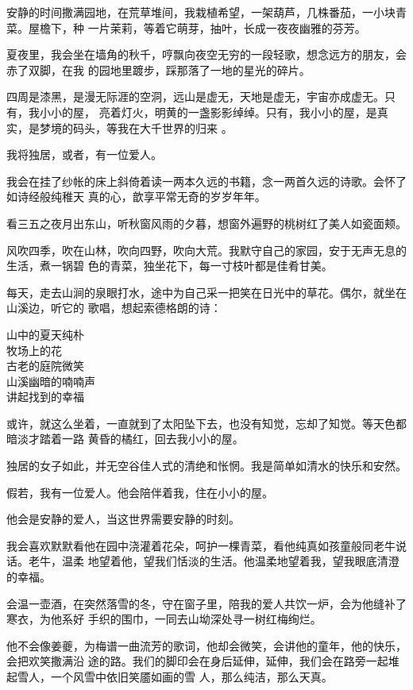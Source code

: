 \documentclass[12pt,a4paper]{article}
\begin{document}
		安静的时间撒满园地，在荒草堆间，我栽植希望，一架葫芦，几株番茄，一小块青菜。屋檐下，种
	一片茉莉，等着它萌芽，抽叶，长成一夜夜幽雅的芬芳。

		夏夜里，我会坐在墙角的秋千，哼飘向夜空无穷的一段轻歌，想念远方的朋友，会赤了双脚，在我
	的园地里踱步，踩那落了一地的星光的碎片。

		四周是漆黑，是漫无际涯的空洞，远山是虚无，天地是虚无，宇宙亦成虚无。只有，我小小的屋，
	亮着灯火，明黄的一盏影影绰绰。只有，我小小的屋，是真实，是梦境的码头，等我在大千世界的归来
	。

		我将独居，或者，有一位爱人。

		我会在挂了纱帐的床上斜倚着读一两本久远的书籍，念一两首久远的诗歌。会怀了如诗经般纯稚天
	真的心，歆享平常无奇的岁岁年年。

		看三五之夜月出东山，听秋窗风雨的夕暮，想窗外遍野的桃树红了美人如瓷面颊。

		风吹四季，吹在山林，吹向四野，吹向大荒。我默守自己的家园，安于无声无息的生活，煮一锅碧
	色的青菜，独坐花下，每一寸枝叶都是佳肴甘美。

		每天，走去山涧的泉眼打水，途中为自己采一把笑在日光中的草花。偶尔，就坐在山溪边，听它的
	歌唱，想起索德格朗的诗：

		\longpoem{}{}{}
		山中的夏天纯朴 \\
		牧场上的花 \\
		古老的庭院微笑 \\
		山溪幽暗的喃喃声 \\
		讲起找到的幸福
		\endlongpoem

		或许，就这么坐着，一直就到了太阳坠下去，也没有知觉，忘却了知觉。等天色都暗淡才踏着一路
	黄昏的橘红，回去我小小的屋。

		独居的女子如此，并无空谷佳人式的清绝和怅惘。我是简单如清水的快乐和安然。

		假若，我有一位爱人。他会陪伴着我，住在小小的屋。\par
		他会是安静的爱人，当这世界需要安静的时刻。

		我会喜欢默默看他在园中浇灌着花朵，呵护一棵青菜，看他纯真如孩童般同老牛说话。老牛，温柔
	地望着他，望我们恬淡的生活。他温柔地望着我，望我眼底清澄的幸福。

		会温一壶酒，在突然落雪的冬，守在窗子里，陪我的爱人共饮一炉，会为他缝补了寒衣，为他系好
	手织的围巾，一同去山坳深处寻一树红梅绚烂。

		他不会像姜夔，为梅谱一曲流芳的歌词，他却会微笑，会讲他的童年，他的快乐，会把欢笑撒满沿
	途的路。我们的脚印会在身后延伸，延伸，我们会在路旁一起堆起雪人，一个风雪中依旧笑靥如画的雪
	人，那么纯洁，那么天真。
\end{document}
